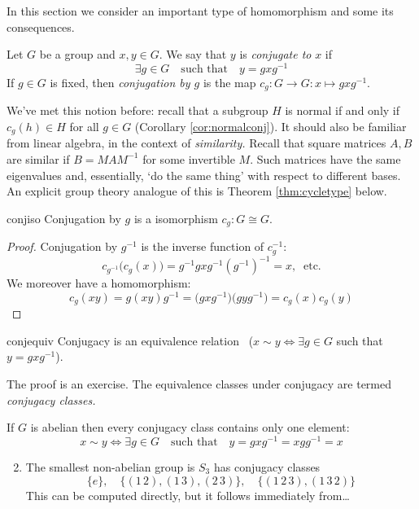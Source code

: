 In this section we consider an important type of homomorphism and some its consequences.

\begin{defn}{}{}
	Let $G$ be a group and $x,y\in G$. We say that $y$ is \emph{conjugate to} $x$ if
	\[
		\exists g\in G\quad\text{such that}\quad y=gx g^{-1}
	\]
	If $g\in G$ is fixed, then \emph{conjugation by $g$} is the map $c_g:G\to G:x\mapsto gx g^{-1}$.
\end{defn}

We've met this notion before: recall that a subgroup $H$ is normal if and only if $c_g(h)\in H$ for all $g\in G$ (Corollary \ref{cor:normalconj}). It should also be familiar from linear algebra, in the context of \emph{similarity.} Recall that square matrices $A,B$ are similar if $B=MAM^{-1}$ for some invertible $M$. Such matrices have the same eigenvalues and, essentially, `do the same thing' with respect to different bases. An explicit group theory analogue of this is Theorem \ref{thm:cycletype} below.


\begin{lemm}{}{conjiso}
	Conjugation by $g$ is a isomorphism $c_g:G\cong G$.
\end{lemm}

\begin{proof}
	Conjugation by $g^{-1}$ is the inverse function of $c_g^{-1}$:
	\[
		c_{g^{-1}}\bigl(c_g(x)\bigr)=g^{-1}gx g^{-1}(g^{-1})^{-1}=x,\ \text{ etc.}
	\]
	We moreover have a homomorphism:
	\[
		c_g(xy)=g(xy)g^{-1}
		=\bigl(gx g^{-1}\bigr)\bigl(gy g^{-1}\bigr)
		=c_g(x)c_g(y)
		\tag*{\qedhere}
	\]
\end{proof}


\begin{lemm}{}{conjequiv}
	Conjugacy is an equivalence relation \ ($x\sim y\iff \exists g\in G$ such that $y=gx g^{-1}$).
\end{lemm}

The proof is an exercise. The equivalence classes under conjugacy are termed \emph{conjugacy classes.}


\begin{examples}{}{}
	\exstart If $G$ is abelian then every conjugacy class contains only one element:
	\[
		x\sim y\iff \exists g\in G
		\quad\text{such that}\quad 
		y=gx g^{-1}=xg g^{-1}=x
	\]
	\begin{enumerate}\setcounter{enumi}{1}
		\item The smallest non-abelian group is $S_3$ has conjugacy classes
		\[
			\{e\},\quad \{(1\,2),(1\,3),(2\,3)\},\quad \{(1\,2\,3),(1\,3\,2)\}
		\]
		This can be computed directly, but it follows immediately from\ldots
	\end{enumerate}
\end{examples}

